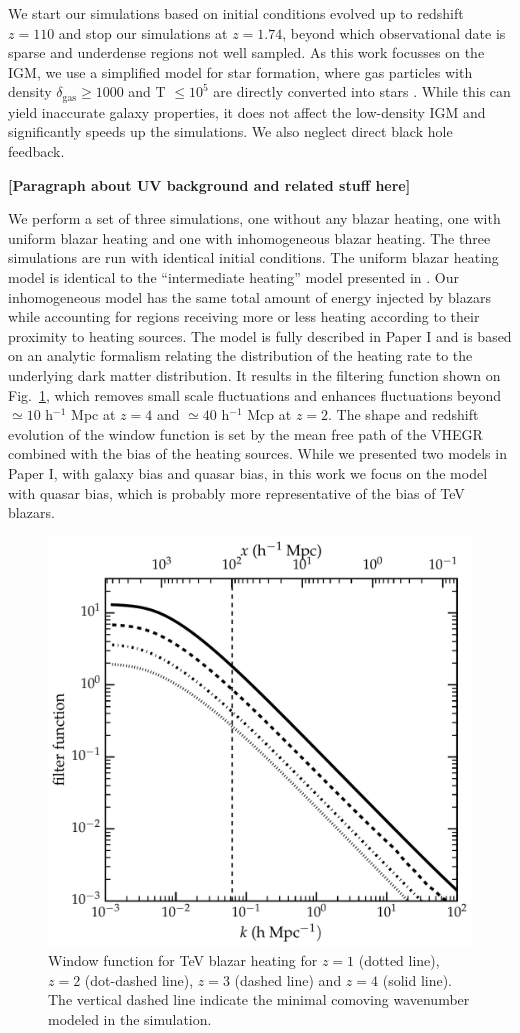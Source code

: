 \documentclass[numberedappendix]{emulateapj}
\newcommand\ALc[1]{{\color{red} \bf #1}} %
\begin{document}
We start our simulations based on initial conditions evolved up to redshift $z=110$ and stop our simulations at $z=1.74$, beyond which observational date is sparse and underdense regions not well sampled. As this work focusses on the IGM, we use a simplified model for star formation, where gas particles with  density $\delta_{\mathrm{gas}}\geq 1000$ and T $\leq 10^5$ are directly converted into stars \citep{2004MNRAS.354..684V}. While this can yield inaccurate galaxy properties, it does not affect the low-density IGM and significantly speeds up the simulations. We also neglect direct black hole feedback.


\ALc{[Paragraph about UV  background and related stuff here]}

We perform a set of three simulations, one without any blazar heating, one with uniform blazar heating and one with inhomogeneous blazar heating.  The three simulations are run with identical initial conditions. The uniform blazar heating model is identical to the ``intermediate heating'' model presented in \citet{2012MNRAS.423..149P}.  Our inhomogeneous model has the same total amount of energy injected by blazars while accounting for regions receiving more or less heating according to their proximity to heating sources. The model is fully described in Paper I  and is based on an analytic formalism relating the distribution of the heating rate to the underlying dark matter distribution. It results in the  filtering function shown on Fig.~\ref{fig:window}, which  removes small scale fluctuations and enhances fluctuations beyond $\simeq 10$ h$^{-1}$ Mpc at $z=4$ and $\simeq 40$ h$^{-1}$ Mcp at $z=2$.  The shape and redshift evolution of the  window function is set by the mean free path of the VHEGR combined with the bias of the heating sources.  While we presented two models in Paper I, with galaxy bias and quasar bias, in this work we focus on the model with quasar bias, which is probably more representative of the bias of TeV blazars.  

\begin{figure}[h]
\centering
 \includegraphics[width = .45\textwidth ]{window_qso}
\caption{Window function for TeV blazar heating for $z=1$ (dotted line), $z=2$ (dot-dashed line), $z=3$ (dashed line)  and $z=4$ (solid line).  The vertical dashed line indicate the minimal comoving wavenumber modeled in the simulation.}
\label{fig:window}
\end{figure}
\end{document}
